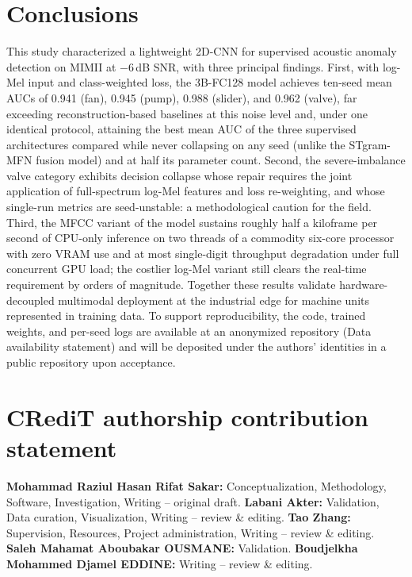 \documentclass[review,nopreprintline]{elsarticle}
\newcommand{\msFanAuc}{0.941}    \newcommand{\msFanAucSd}{0.009}    \newcommand{\msFanAucCI}{[0.934, 0.946]}
\newcommand{\msPumpAuc}{0.945}   \newcommand{\msPumpAucSd}{0.011}   \newcommand{\msPumpAucCI}{[0.938, 0.952]}
\newcommand{\msSliderAuc}{0.988} \newcommand{\msSliderAucSd}{0.006} \newcommand{\msSliderAucCI}{[0.985, 0.992]}
\newcommand{\msValveAuc}{0.962}  \newcommand{\msValveAucSd}{0.026}  \newcommand{\msValveAucCI}{[0.945, 0.976]}
\begin{document}
\section{Conclusions}
\label{sec:conclusion}

This study characterized a lightweight 2D-CNN for supervised acoustic anomaly detection on MIMII at $-6$\,dB SNR, with three principal findings. First, with log-Mel input and class-weighted loss, the 3B-FC128 model achieves ten-seed mean AUCs of \msFanAuc{} (fan), \msPumpAuc{} (pump), \msSliderAuc{} (slider), and \msValveAuc{} (valve), far exceeding reconstruction-based baselines at this noise level and, under one identical protocol, attaining the best mean AUC of the three supervised architectures compared while never collapsing on any seed (unlike the STgram-MFN fusion model) and at half its parameter count. Second, the severe-imbalance valve category exhibits decision collapse whose repair requires the joint application of full-spectrum log-Mel features and loss re-weighting, and whose single-run metrics are seed-unstable: a methodological caution for the field. Third, the MFCC variant of the model sustains roughly half a kiloframe per second of CPU-only inference on two threads of a commodity six-core processor with zero VRAM use and at most single-digit throughput degradation under full concurrent GPU load; the costlier log-Mel variant still clears the real-time requirement by orders of magnitude. Together these results validate hardware-decoupled multimodal deployment at the industrial edge for machine units represented in training data. To support reproducibility, the code, trained weights, and per-seed logs are available at an anonymized repository (Data availability statement) and will be deposited under the authors' identities in a public repository upon acceptance.

\section*{CRediT authorship contribution statement}
\textbf{Mohammad Raziul Hasan Rifat Sakar:} Conceptualization, Methodology, Software, Investigation, Writing -- original draft. \textbf{Labani Akter:} Validation, Data curation, Visualization, Writing -- review \& editing. \textbf{Tao Zhang:} Supervision, Resources, Project administration, Writing -- review \& editing. \textbf{Saleh Mahamat Aboubakar OUSMANE:} Validation. \textbf{Boudjelkha Mohammed Djamel EDDINE:} Writing -- review \& editing.
\end{document}
